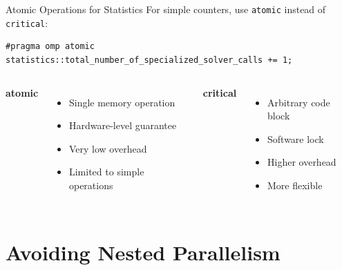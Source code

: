 \documentclass{beamer}
\begin{document}
\begin{frame}[fragile]{Atomic Operations for Statistics}
For simple counters, use \texttt{atomic} instead of \texttt{critical}:

\begin{lstlisting}
#pragma omp atomic
statistics::total_number_of_specialized_solver_calls += 1;
\end{lstlisting}

\vspace{1em}
\begin{columns}
\textbf{atomic}
\begin{itemize}
    \item Single memory operation
    \item Hardware-level guarantee
    \item Very low overhead
    \item Limited to simple operations
\end{itemize}

\textbf{critical}
\begin{itemize}
    \item Arbitrary code block
    \item Software lock
    \item Higher overhead
    \item More flexible
\end{itemize}
\end{columns}
\end{frame}

\section{Avoiding Nested Parallelism}
\end{document}
